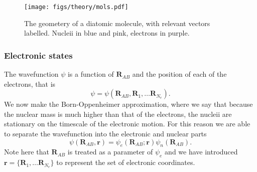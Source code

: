 \begin{figure}
  \centering
  \texttt{[image: figs/theory/mols.pdf]}
  \caption[Geometry of a diatomic molecule]{
    The geometery of a diatomic molecule, with relevant vectors labelled.
    Nucleii in blue and pink, electrons in purple.
  }
  \label{theory:fig:mol}
\end{figure}


\subsubsection{Electronic states}

The wavefunction
$\psi$ is a function of $\mathbf{R}_{AB}$ and the position of each of the
electrons, that is
%
\begin{equation}
  \psi = \psi(\mathbf{R}_{AB}, \mathbf{R}_1, \dots \mathbf{R}_{N_e}).
\end{equation}
%
We now make the Born-Oppenheimer approximation, where we say that because the
nuclear mass is much higher than that of the electrons, the nucleii are
stationary on the timescale of the electronic motion. For this
reason we are able to separate the wavefunction into the electronic and nuclear
parts
%
\begin{equation}
  \psi(\mathbf{R}_{AB}, \mathbf{r}) = \psi_e(\mathbf{R}_{AB}; \mathbf{r})
  \psi_n(\mathbf{R}_{AB}).
\end{equation}
%
Note here that $\mathbf{R}_{AB}$ is treated as a parameter of $\psi_e$ and we
have introduced $\mathbf{r} = \{\mathbf{R}_1, \dots \mathbf{R}_{N_e} \}$ to
represent the set of electronic coordinates.

